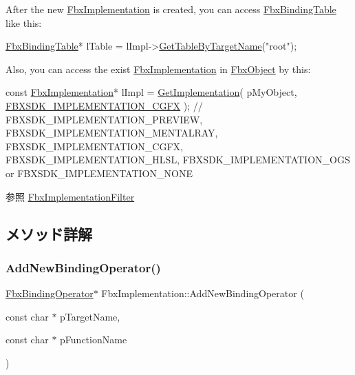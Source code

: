 After the new \hyperlink{class_fbx_implementation}{Fbx\+Implementation} is created, you can access \hyperlink{class_fbx_binding_table}{Fbx\+Binding\+Table} like this\+: 
\begin{DoxyCode}
\hyperlink{class_fbx_binding_table}{FbxBindingTable}* lTable = lImpl->\hyperlink{class_fbx_implementation_a45821c1d329404af513665d9809bab69}{GetTableByTargetName}(\textcolor{stringliteral}{"root"});
\end{DoxyCode}
 Also, you can access the exist \hyperlink{class_fbx_implementation}{Fbx\+Implementation} in \hyperlink{class_fbx_object}{Fbx\+Object} by this\+: 
\begin{DoxyCode}
\textcolor{keyword}{const} \hyperlink{class_fbx_implementation}{FbxImplementation}* lImpl = \hyperlink{class_fbx_object_a396d7a8496c2eef786ce73bac59ab55a}{GetImplementation}( pMyObject, 
      \hyperlink{fbxshadingconventions_8h_aa61dfbcf9b694b8a4f189c6a77c2c2b6}{FBXSDK\_IMPLEMENTATION\_CGFX} ); \textcolor{comment}{// FBXSDK\_IMPLEMENTATION\_PREVIEW,
       FBXSDK\_IMPLEMENTATION\_MENTALRAY, FBXSDK\_IMPLEMENTATION\_CGFX, FBXSDK\_IMPLEMENTATION\_HLSL, FBXSDK\_IMPLEMENTATION\_OGS or
       FBXSDK\_IMPLEMENTATION\_NONE}
\end{DoxyCode}


\begin{DoxySeeAlso}{参照}
\hyperlink{class_fbx_implementation_filter}{Fbx\+Implementation\+Filter} 
\end{DoxySeeAlso}


\subsection{メソッド詳解}
\mbox{\label{class_fbx_implementation_abc8cd44b869458fd075729c26efcafd9}} 
\subsubsection{\texorpdfstring{Add\+New\+Binding\+Operator()}{AddNewBindingOperator()}}
{\footnotesize\ttfamily \hyperlink{class_fbx_binding_operator}{Fbx\+Binding\+Operator}$\ast$ Fbx\+Implementation\+::\+Add\+New\+Binding\+Operator (\begin{DoxyParamCaption}\item[{const char $\ast$}]{p\+Target\+Name,  }\item[{const char $\ast$}]{p\+Function\+Name }\end{DoxyParamCaption})}

